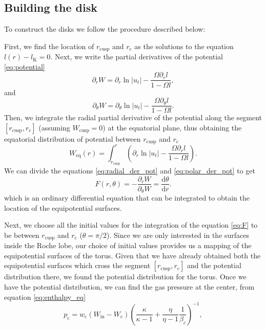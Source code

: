 \documentclass{aa}
\begin{document}
\subsection{Building the disk}

To construct the disks we follow the procedure described below:

First, we find the location of $r_{\mathrm{cusp}}$ and $r_{\mathrm{c}}$ as the solutions to the equation $l(r) - l_{\mathrm{K}} = 0$.
Next, we write the partial derivatives of the potential \eqref{eq:potential}
\begin{equation}\label{eq:radial_der_pot}
\partial_r W = \partial_r \ln|u_t| - \frac{\Omega \partial_rl}{1 - \Omega l},
\end{equation}
and
\begin{equation}\label{eq:polar_der_pot}
\partial_{\theta} W = \partial_{\theta} \ln|u_t| - \frac{\Omega \partial_{\theta}l}{1 - \Omega l}.
\end{equation}
Then, we integrate the radial partial derivative of the potential along the segment $[r_{\mathrm{cusp}}, r_{\mathrm{c}}]$ (assuming $W_{\mathrm{cusp}} = 0$) at the equatorial plane, thus obtaining the equatorial distribution of potential between $r_{\mathrm{cusp}}$ and $r_{\mathrm{c}}$
\begin{equation}\label{eq:equatorial_pot}
W_{\mathrm{eq}}(r) = \int^{r}_{r_{\mathrm{cusp}}}\left(\partial_r \ln|u_t| - \frac{\Omega \partial_rl}{1 - \Omega l}\right).
\end{equation}
We can divide the equations \eqref{eq:radial_der_pot} and \eqref{eq:polar_der_pot} \citep{Qian:2009} to get
\begin{equation}\label{eq:F}
F(r, \theta) = -\frac{\partial_r W}{\partial_{\theta} W} = \frac{\mathrm{d}\theta}{\mathrm{d}r}.
\end{equation}
which is an ordinary differential equation that can be integrated to obtain the location of the equipotential surfaces.

Next, we choose all the initial values for the integration of the equation \eqref{eq:F} to be between $r_{\mathrm{cusp}}$ and $r_{\mathrm{c}}$ ($\theta = \pi / 2$). Since we are only interested in the surfaces inside the Roche lobe, our choice of initial values provides us a mapping of the equipotential surfaces of the torus. Given that we have already obtained both the equipotential surfaces which cross the segment $[r_{\mathrm{cusp}}, r_{\mathrm{c}}]$ and the potential distribution there, we found the potential distribution for the torus.
Once we have the potential distribution, we can find the gas pressure at the center, from equation \eqref{eq:enthalpy_eq}
\begin{equation}
p_{\mathrm{c}} = w_{\mathrm{c}}(W_{\mathrm{in}} - W_{\mathrm{c}})\left(\frac{\kappa}{\kappa - 1} + \frac{\eta}{\eta - 1}\frac{1}{\beta_c}\right)^{-1},
\end{equation}
\end{document}
